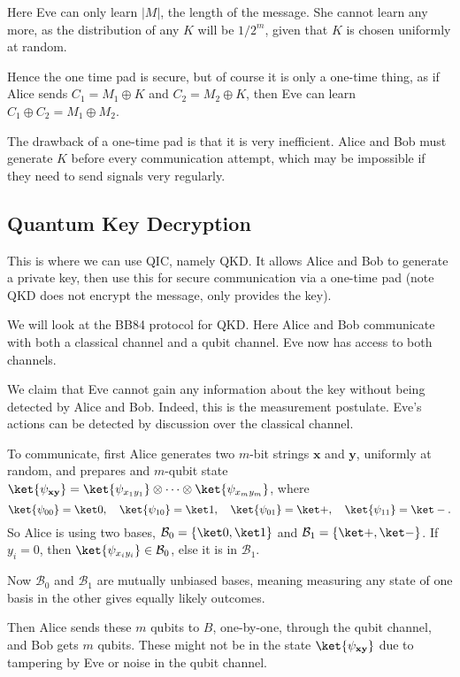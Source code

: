 \documentclass[12pt]{article}
\begin{document}
Here Eve can only learn $|M|$, the length of the message. She cannot learn any more, as the distribution of any $K$ will be $1/2^m$, given that $K$ is chosen uniformly at random.

Hence the one time pad is secure, but of course it is only a one-time thing, as if Alice sends $C_1 = M_1 \oplus K$ and $C_2 = M_2 \oplus K$, then Eve can learn $C_1 \oplus C_2 = M_1 \oplus M_2$.

The drawback of a one-time pad is that it is very inefficient. Alice and Bob must generate $K$ before every communication attempt, which may be impossible if they need to send signals very regularly.

\subsection{Quantum Key Decryption}
\label{sub:qkd}

This is where we can use QIC, namely QKD. It allows Alice and Bob to generate a private key, then use this for secure communication via a one-time pad (note QKD does not encrypt the message, only provides the key).

We will look at the BB84 protocol for QKD. Here Alice and Bob communicate with both a classical channel and a qubit channel. Eve now has access to both channels.

We claim that Eve cannot gain any information about the key without being detected by Alice and Bob. Indeed, this is the measurement postulate. Eve's actions can be detected by discussion over the classical channel.

To communicate, first Alice generates two $m$-bit strings $\mathbf{x}$ and $\mathbf{y}$, uniformly at random, and prepares and $m$-qubit state $\ket{\psi_{\mathbf{x}\mathbf{y}}} = \ket{\psi_{x_1 y_1}} \otimes \cdots \otimes \ket{\psi_{x_m y_m}}$, where
\[
	\ket{\psi_{00}} = \ket 0, \quad \ket{\psi_{10}} = \ket 1, \quad\ket{\psi_{01}} = \ket +, \quad\ket{\psi_{11}} = \ket -.
\]
So Alice is using two bases, $\mathcal{B}_0 = \{\ket 0, \ket 1\}$ and $\mathcal{B}_1 = \{\ket +, \ket -\}$. If $y_i = 0$, then $\ket{\psi_{x_iy_i}} \in \mathcal{B}_0$, else it is in $\mathcal{B}_1$.

Now $\mathcal{B}_0$ and $\mathcal{B}_1$ are mutually unbiased bases, meaning measuring any state of one basis in the other gives equally likely outcomes.


Then Alice sends these $m$ qubits to $B$, one-by-one, through the qubit channel, and Bob gets $m$ qubits. These might not be in the state $\ket{\psi_{\mathbf{x}\mathbf{y}}}$ due to tampering by Eve or noise in the qubit channel.
\end{document}
